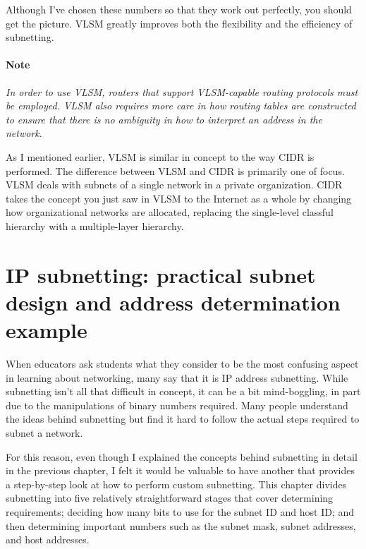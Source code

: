 \documentclass[b5paper,11pt]{memoir}
\begin{document}
Although I've chosen these numbers so that they work out perfectly, you
should get the picture. VLSM greatly improves both the flexibility and
the efficiency of subnetting.

\subsubsection[Note]{\texorpdfstring{\protect\hypertarget{ch18s08.htmlux5cux23note-76}{}{}Note}{Note}}

{\emph{In order to use VLSM, routers that support VLSM-capable routing
protocols must be employed. VLSM also requires more care in how routing
tables are constructed to ensure that there is no ambiguity in how to
interpret an address in the
network}}\protect\hypertarget{ch18s08.htmlux5cux23idx-CHP-18-0745}{}{}.

As I mentioned earlier, VLSM is similar in concept to the way CIDR is
performed. The difference between VLSM and CIDR is primarily one of
focus. VLSM deals with subnets of a single network in a private
organization. CIDR takes the concept you just saw in VLSM to the
Internet as a whole by changing how organizational networks are
allocated, replacing the single-level classful hierarchy with a
multiple-layer hierarchy.





\chapter{IP subnetting: practical subnet design and address determination example}

When educators ask students what they consider to be the most confusing
aspect in learning about networking, many say that it is IP address
subnetting. While subnetting isn't all that difficult in concept, it can
be a bit mind-boggling, in part due to the manipulations of binary
numbers required. Many people understand the ideas behind subnetting but
find it hard to follow the actual steps required to subnet a network.

For this reason, even though I explained the concepts behind subnetting
in detail in the previous chapter, I felt it would be valuable to have
another that provides a step-by-step look at how to perform custom
subnetting. This chapter divides subnetting into five relatively
straightforward stages that cover determining requirements; deciding how
many bits to use for the subnet ID and host ID; and then determining
important numbers such as the subnet mask, subnet addresses, and host
addresses.
\end{document}
